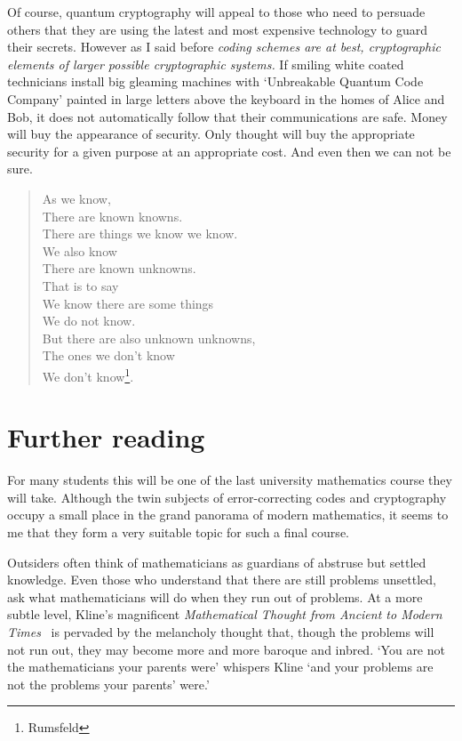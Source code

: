 Of course, quantum cryptography will appeal to
those who need to persuade others that they are using
the latest and most expensive technology to
guard their secrets. However as I said before
\emph{coding schemes
are at best, cryptographic elements
of larger possible cryptographic systems.}
If smiling white coated technicians install big 
gleaming machines with `Unbreakable
Quantum Code Company' painted in large letters
above the keyboard in the homes of Alice and Bob,
it does not automatically follow that their
communications are safe. Money will buy
the appearance of security. Only thought will buy
the appropriate security for a given purpose
at an appropriate cost. And even then we can not
be sure.

\begin{verse}
As we know,\\
There are known knowns.\\
There are things we know we know.\\
We also know\\
There are known unknowns.\\
That is to say\\
We know there are some things\\
We do not know.\\
But there are also unknown unknowns,\\
The ones we don't know\\
We don't know\footnote{Rumsfeld}.
\end{verse}

\section{Further reading} For many students
this will be one of the last university mathematics
course they will take. Although the twin
subjects of error-correcting codes and
cryptography occupy a small place in the
grand panorama of modern mathematics,
it seems to me that they form a very suitable
topic for such a final course.

Outsiders often think of mathematicians as
guardians of abstruse but settled knowledge.
Even those who understand that there are
still problems unsettled, ask what
mathematicians will do when they run out
of problems. At a more subtle
level, Kline's magnificent
\emph{Mathematical Thought from Ancient to
Modern Times}~\cite{Kline} is pervaded by
the melancholy thought
that, though the problems
will not run out, they may become more
and more baroque and inbred. `You are not the mathematicians
your
parents were' whispers Kline
`and your problems are not the
problems your parents' were.'

